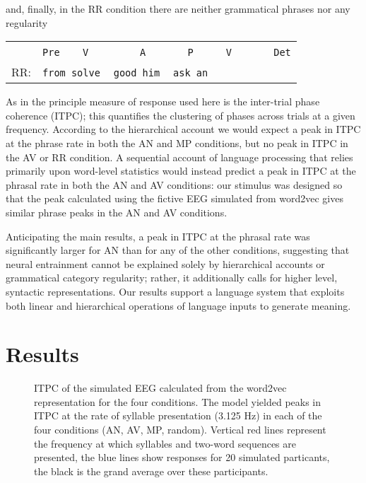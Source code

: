 \documentclass[10pt,letterpaper]{article}
\newcommand{\tts}{%
  \texttt{\,}
}
\begin{document}
and, finally, in the RR condition there are neither grammatical phrases nor any regularity
\begin{center}
  \begin{tabular}{cl}
   &\texttt{Pre}\tts{}\tts{}\texttt{V}\tts\tts\tts{}\tts{}\tts{}\texttt{A}\tts{}\tts\tts{}\tts{}\texttt{P}\tts{}\tts{}\tts{}\texttt{V}\tts\tts\tts\tts{}\texttt{Det}\\ 
RR:&\texttt{from solve}\tts\texttt{good him}{}\tts\texttt{ask an}
\end{tabular}
\end{center}

As in \cite{DingEtAl2017} the principle measure of response used here
is the inter-trial phase coherence (ITPC); this quantifies the
clustering of phases across trials at a given frequency. According to
the hierarchical account we would expect a peak in ITPC at the phrase
rate in both the AN and MP conditions, but no peak in ITPC in the AV
or RR condition. A sequential account of language processing that
relies primarily upon word-level statistics would instead predict a
peak in ITPC at the phrasal rate in both the AN and AV conditions: our
stimulus was designed so that the peak calculated using the
fictive EEG simulated from word2vec gives similar phrase peaks in the
AN and AV conditions.

Anticipating the main results, a peak in ITPC at the phrasal rate was
significantly larger for AN than for any of the other conditions,
suggesting that neural entrainment cannot be explained solely by
hierarchical accounts or grammatical category regularity; rather, it
additionally calls for higher level, syntactic representations. Our
results support a language system that exploits both linear and
hierarchical operations of language inputs to generate meaning.

\section*{Results}

\begin{figure}[tbhp]

\caption{ITPC of the simulated EEG calculated from the word2vec
  representation for the four conditions. The model yielded peaks in
  ITPC at the rate of syllable presentation (3.125 Hz) in each of the
  four conditions (AN, AV, MP, random). Vertical red lines represent
  the frequency at which syllables and two-word sequences are
  presented, the blue lines show responses for 20 simulated
  particants, the black is the grand average over these participants.
}
\label{fig:Fig1}
\end{figure}
\end{document}
